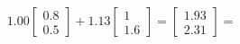 \documentclass[preview]{standalone}
\begin{document}
\begin{align*}
1.00 \begin{bmatrix} 0.8 \\ 0.5 \end{bmatrix} + 1.13 \begin{bmatrix} 1 \\ 1.6 \end{bmatrix} = \begin{bmatrix} 1.93 \\ 2.31 \end{bmatrix} =
\end{align*}
\end{document}
